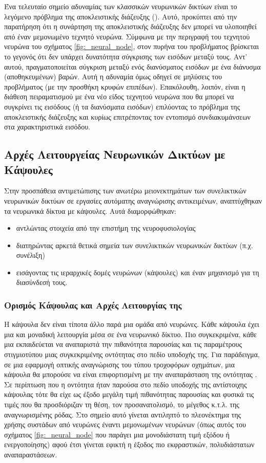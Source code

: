 Ένα τελευταίο σημείο αδυναμίας των κλασσικών νευρωνικών δικτύων είναι το λεγόμενο πρόβλημα της αποκλειστικής διάζευξης ()\cite{rumelhart1985learning_internal_representations}. Αυτό, προκύπτει από την παρατήρηση ότι η συνάρτηση της αποκλειστικής διάζευξης δεν μπορεί να υλοποιηθεί από έναν μεμονωμένο τεχνητό νευρώνα. Σύμφωνα με την περιγραφή του τεχνητού νευρώνα του σχήματος \ref{fig:_neural_node}, στον πυρήνα του προβλήματος βρίσκεται το γεγονός ότι δεν υπάρχει δυνατότητα σύγκρισης των εισόδων μεταξύ τους. Αντ' αυτού, πραγματοποιείται σύγκριση μεταξύ ενός διανύσματος εισόδων με ένα διάνυσμα (αποθηκευμένων) βαρών. Αυτή η αδυναμία όμως οδηγεί σε μη λύσεις του προβλήματος (με την προσθήκη κρυφών επιπέδων). Επακόλουθη, λοιπόν, είναι η διάθεση πειραματισμού με ένα νέο είδος τεχνητού νευρώνα που θα μπορεί να συγκρίνει τις εισόδους (ή τα διανύσματα εισόδων) επιλύοντας το πρόβλημα της αποκλειστικής διάζευξης και κυρίως επιτρέποντας τον εντοπισμό συνδιακυμάνσεων στα χαρακτηριστικά εισόδου.


\subsection{Αρχές Λειτουργείας Νευρωνικών Δικτύων με Κάψουλες}
Στην προσπάθεια αντιμετώπισης των ανωτέρω μειονεκτημάτων των συνελικτικών νευρωνικών δικτύων σε εργασίες αυτόματης αναγνώρισης αντικειμένων, αναπτύχθηκαν τα νευρωνικά δίκτυα με κάψουλες. Αυτά διαμορφώθηκαν:
\begin{itemize}
  \item αντλώντας στοιχεία από την επιστήμη της νευροφυσιολογίας
  \item διατηρώντας αρκετά θετικά σημεία των συνελικτικών νευρωνικών δικτύων (π.χ. συνέλιξη)
  \item εισάγοντας τις ιεραρχικές δομές νευρώνων (κάψουλες) και έναν μηχανισμό για τη διασύνδεσή τους.
\end{itemize}

\subsubsection{Ορισμός Κάψουλας και Αρχές Λειτουργίας της}
Η κάψουλα δεν είναι τίποτα άλλο παρά μια ομάδα από νευρώνες. Κάθε κάψουλα έχει μια και μοναδική λειτουργία μέσα σε ένα νευρωνικό δίκτυο. Πιο συγκεκριμένα, κάθε μια εκπαιδεύεται να αναπαριστά την πιθανότητα παρουσίας και τις παραμέτρους στιγμιοτύπου μιας συγκεκριμένης οντότητας στο πεδίο υποδοχής της. Για παράδειγμα, σε μια εφαρμογή οπτικής αναγνώρισης του τύπου τροχοφόρων οχημάτων, μια κάψουλα θα μπορούσε να είναι επιφορτισμένη με την αναπαράσταση της οντότητας . Σε περίπτωση που η οντότητα ήταν παρούσα στο πεδίο υποδοχής της αντίστοιχης κάψουλας τότε θα είχε ως έξοδο μεγάλη τιμή πιθανότητας παρουσίας και φυσικά τις τιμές που θα προσδιόριζαν τη θέση, τον προσανατολισμό, το μέγεθος κ.τ.λ. της αναγνωρισμένης ρόδας. Στο σημείο αυτό γίνεται αντιληπτό το πλεονέκτημα της χρήσης συστάδων από νευρώνες έναντι μεμονωμένων νευρώνων (όπως αυτός του σχήματος \ref{fig:_neural_node} που παράγει μια μονοδιάστατη τιμή εξόδου ή ενεργοποίησης) αφού έτσι γίνεται εφικτή η έξοδος πιο εκφραστικών, πολυδιάστατων αναπαραστάσεων.\par

